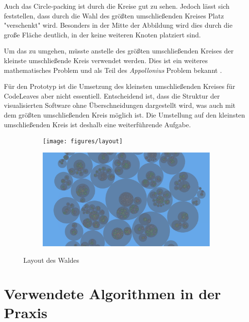 Auch das Circle-packing ist durch die Kreise gut zu sehen. Jedoch lässt sich feststellen, dass durch die Wahl des größten umschließenden Kreises Platz "verschenkt" wird. Besonders in der Mitte der Abbildung wird dies durch die große Fläche deutlich, in der keine weiteren Knoten platziert sind.

Um das zu umgehen, müsste anstelle des größten umschließenden Kreises der kleinste umschließende Kreis verwendet werden. Dies ist ein weiteres mathematisches Problem und als Teil des \textit{Appollonius} Problem bekannt \cite{dergiades2007soddy}.

Für den Prototyp ist die Umsetzung des kleinsten umschließenden Kreises für CodeLeaves aber nicht essentiell. Entscheidend ist, dass die Struktur der visualisierten Software ohne Überschneidungen dargestellt wird, was auch mit dem größten umschließenden Kreis möglich ist. Die Umstellung auf den kleinsten umschließenden Kreis ist deshalb eine weiterführende Aufgabe.

\begin{figure}[htbp]
  \centering
  \begin{subfigure}[t]{\textwidth}
    \centering
    \texttt{[image: figures/layout]}
     \label{fig:layout-side}
  \end{subfigure}
  \par\bigskip
  \begin{subfigure}[t]{\textwidth}
    \centering
  	\includegraphics[width=\textwidth]{figures/Circle-packing}
  	 \label{fig:layout-top}
  \end{subfigure}
  \caption{Layout des Waldes} \label{fig:layout}
\end{figure}

\section{Verwendete Algorithmen in der Praxis}

